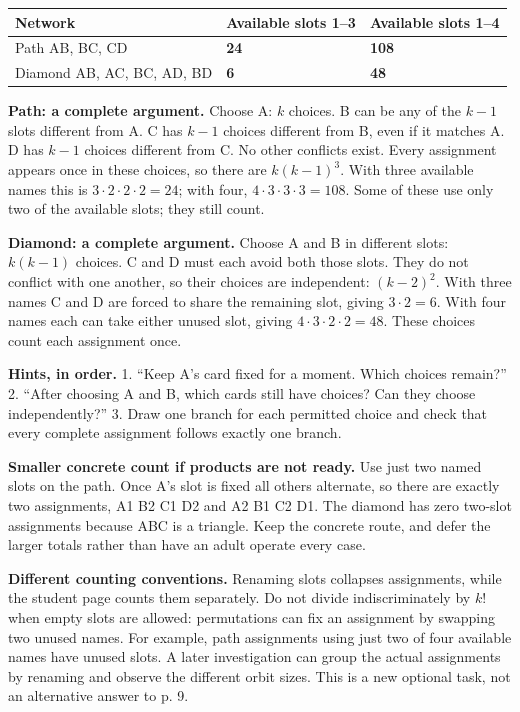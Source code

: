 \documentclass[10pt,letterpaper]{article}
\newcommand{\topic}[1]{\vspace{3pt}{\large\bfseries #1}\par}
\newcommand{\labelled}[2]{\textbf{#1} #2\par}
\newcommand{\hint}[1]{\textbf{Hints, in order.} #1\par}
\begin{document}
\begin{tabularx}{\linewidth}{@{}Xp{1.15in}p{1.15in}@{}}
\toprule
Network & Available slots 1--3 & Available slots 1--4 \\
\midrule
Path AB, BC, CD & \textbf{24} & \textbf{108} \\
Diamond AB, AC, BC, AD, BD & \textbf{6} & \textbf{48} \\
\bottomrule
\end{tabularx}\par\smallskip
\labelled{Path: a complete argument.}{Choose A: \(k\) choices. B can be any of the \(k-1\) slots different from A. C has \(k-1\) choices different from B, even if it matches A. D has \(k-1\) choices different from C. No other conflicts exist. Every assignment appears once in these choices, so there are \(k(k-1)^3\). With three available names this is \(3\cdot2\cdot2\cdot2=24\); with four, \(4\cdot3\cdot3\cdot3=108\). Some of these use only two of the available slots; they still count.}
\labelled{Diamond: a complete argument.}{Choose A and B in different slots: \(k(k-1)\) choices. C and D must each avoid both those slots. They do not conflict with one another, so their choices are independent: \((k-2)^2\). With three names C and D are forced to share the remaining slot, giving \(3\cdot2=6\). With four names each can take either unused slot, giving \(4\cdot3\cdot2\cdot2=48\). These choices count each assignment once.}
\hint{1. ``Keep A's card fixed for a moment. Which choices remain?'' 2. ``After choosing A and B, which cards still have choices? Can they choose independently?'' 3. Draw one branch for each permitted choice and check that every complete assignment follows exactly one branch.}
\labelled{Smaller concrete count if products are not ready.}{Use just two named slots on the path. Once A's slot is fixed all others alternate, so there are exactly two assignments, A1 B2 C1 D2 and A2 B1 C2 D1. The diamond has zero two-slot assignments because ABC is a triangle. Keep the concrete route, and defer the larger totals rather than have an adult operate every case.}
\topic{Adult context and a possible later return}
\labelled{Different counting conventions.}{Renaming slots collapses assignments, while the student page counts them separately. Do not divide indiscriminately by \(k!\) when empty slots are allowed: permutations can fix an assignment by swapping two unused names. For example, path assignments using just two of four available names have unused slots. A later investigation can group the actual assignments by renaming and observe the different orbit sizes. This is a new optional task, not an alternative answer to p. 9.}
\end{document}
